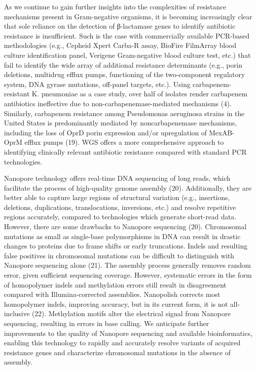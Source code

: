 As we continue to gain further insights into the complexities of resistance mechanisms present in Gram-negative organisms, it is becoming increasingly clear that sole reliance on the detection of β-lactamase genes to identify antibiotic resistance is insufficient. Such is the case with commercially available PCR-based methodologies (e.g., Cepheid Xpert Carba-R assay, BioFire FilmArray blood culture identification panel, Verigene Gram-negative blood culture test, etc.) that fail to identify the wide array of additional resistance determinants (e.g., porin deletions, multidrug efflux pumps, functioning of the two-component regulatory system, DNA gyrase mutations, off-panel targets, etc.). Using carbapenem-resistant K. pneumoniae as a case study, over half of isolates render carbapenem antibiotics ineffective due to non-carbapenemase-mediated mechanisms (4). Similarly, carbapenem resistance among Pseudomonas aeruginosa strains in the United States is predominantly mediated by noncarbapenemase mechanisms, including the loss of OprD porin expression and/or upregulation of MexAB-OprM efflux pumps (19). WGS offers a more comprehensive approach to identifying clinically relevant antibiotic resistance compared with standard PCR technologies.

Nanopore technology offers real-time DNA sequencing of long reads, which facilitate the process of high-quality genome assembly (20). Additionally, they are better able to capture large regions of structural variation (e.g., insertions, deletions, duplications, translocations, inversions, etc.) and resolve repetitive regions accurately, compared to technologies which generate short-read data. However, there are some drawbacks to Nanopore sequencing (20). Chromosomal mutations as small as single-base polymorphisms in DNA can result in drastic changes to proteins due to frame shifts or early truncations. Indels and resulting false positives in chromosomal mutations can be difficult to distinguish with Nanopore sequencing alone (21). The assembly process generally removes random error, given sufficient sequencing coverage. However, systematic errors in the form of homopolymer indels and methylation errors still result in disagreement compared with Illumina-corrected assemblies. Nanopolish corrects most homopolymer indels, improving accuracy, but in its current form, it is not all-inclusive (22). Methylation motifs alter the electrical signal from Nanopore sequencing, resulting in errors in base calling. We anticipate further improvements to the quality of Nanopore sequencing and available bioinformatics, enabling this technology to rapidly and accurately resolve variants of acquired resistance genes and characterize chromosomal mutations in the absence of assembly.

